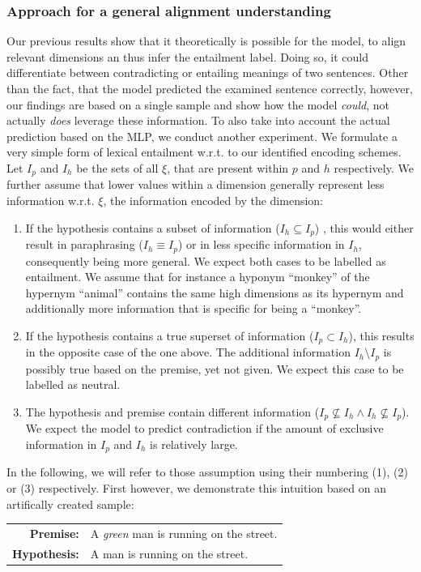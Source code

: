 \subsubsection{Approach for a general alignment understanding}\label{sec:approach_general_alignment_understanding}
Our previous results show that it theoretically is possible for the model, to align relevant dimensions an thus infer the entailment label. Doing so, it could differentiate between contradicting or entailing meanings of two sentences. Other than the fact, that the model predicted the examined sentence correctly, however, our findings are based on a single sample and show how the model \textit{could}, not actually \textit{does} leverage these information. To also take into account the actual prediction based on the \ac{MLP}, we conduct another experiment. We formulate a very simple form of lexical entailment w.r.t. to our identified encoding schemes. Let $I_p$ and $I_h$ be the sets of all $\xi$, that are present within $p$ and $h$ respectively. We further assume that lower values within a dimension generally represent less information w.r.t. $\xi$, the information encoded by the dimension:
\begin{enumerate}
\item If the hypothesis contains a subset of information ($I_h \subseteq I_p$) , this would either result in paraphrasing ($I_h \equiv I_p$) or in less specific information in $I_h$, consequently being more general. We expect both cases to be labelled as entailment. We assume that for instance a hyponym ``monkey'' of the hypernym ``animal'' contains the same high dimensions as its hypernym and additionally more information that is specific for being a ``monkey''.
\item If the hypothesis contains a true superset of information ($I_p \subset I_h$), this results in the opposite case of the one above. The additional information $I_h \setminus I_p$ is possibly true based on the premise, yet not given. We expect this case to be labelled as neutral.
\item The hypothesis and premise contain different information ($I_p \nsubseteq I_h \land I_h \nsubseteq I_p$). We expect the model to predict contradiction if the amount of exclusive information in $I_p$ and $I_h$ is relatively large.
\end{enumerate}
In the following, we will refer to those assumption using their numbering (1), (2) or (3) respectively. First however, we demonstrate this intuition based on an artifically created sample:
\begin{center}
\begin{tabular}{rl}
\textbf{Premise:} & A \textit{green} man is running on the street.
\\
\textbf{Hypothesis:} & A man is running on the street.
\end{tabular}
\end{center}
